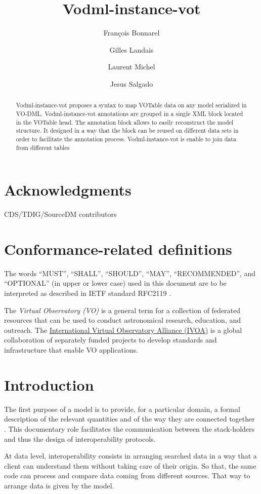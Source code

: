 \documentclass[11pt,a4paper]{ivoa}
\title{Vodml-instance-vot}
\author{François Bonnarel}
\author{Gilles Landais}
\author{Laurent Michel}
\author{Jesus Salgado}
\begin{document}
\begin{abstract}
Vodml-instance-vot proposes a syntax to map VOTable data on any model serialized in VO-DML.
Vodml-instance-vot annotations are grouped in a single XML block located in the VOTable head. The annotation block allows to easily reconstruct the model structure. It designed in a way that the block can be reused on different data sets in order to facilitate the annotation process.
Vodml-instance-vot is enable to join data from different tables
\end{abstract}


\section*{Acknowledgments}
CDS/TDIG/SourceDM contributors

\section*{Conformance-related definitions}

The words ``MUST'', ``SHALL'', ``SHOULD'', ``MAY'', ``RECOMMENDED'', and
``OPTIONAL'' (in upper or lower case) used in this document are to be
interpreted as described in IETF standard RFC2119 \citep{std:RFC2119}.

The \emph{Virtual Observatory (VO)} is a
general term for a collection of federated resources that can be used
to conduct astronomical research, education, and outreach.
The \href{http://www.ivoa.net}{International
Virtual Observatory Alliance (IVOA)} is a global
collaboration of separately funded projects to develop standards and
infrastructure that enable VO applications.


\section{Introduction}
The first purpose of a model is to provide,  for a particular domain, a formal description of the relevant quantities and of the way they are connected together .
This documentary role facilitates the communication between the stack-holders and thus the design of interoperability protocols. 

At data level, interoperability consists in arranging searched data in a way that a client can understand them without taking care of their origin. So that, the same code can process and compare data coming from different sources.  That way to arrange data is given by the model.
\end{document}
